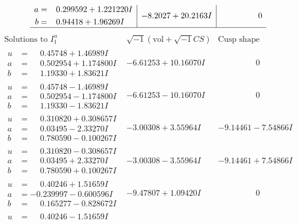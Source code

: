 \documentclass[1p]{elsarticle_modified}
\theoremstyle{definition}
\newcommand{\I}{\sqrt{-1}}
\begin{document}
$$\begin{array}{c|c|c}
\begin{aligned}
a &= \phantom{-}0.299592 + 1.221220 I \\
b &= \phantom{-}0.94418 + 1.96269 I\end{aligned}
 & -8.2027 + 20.2163 I & \phantom{-0.000000 } 0\\
 \hline 
 \end{array}$$\newpage$$\begin{array}{c|c|c}  
\text{Solutions to }I^u_{1}& \I (\text{vol} + \sqrt{-1}CS) & \text{Cusp shape}\\
 \hline 
\begin{aligned}
u &= \phantom{-}0.45748 + 1.46989 I \\
a &= \phantom{-}0.502954 + 1.174800 I \\
b &= \phantom{-}1.19330 + 1.83621 I\end{aligned}
 & -6.61253 + 10.16070 I & \phantom{-0.000000 } 0 \\ \hline\begin{aligned}
u &= \phantom{-}0.45748 - 1.46989 I \\
a &= \phantom{-}0.502954 - 1.174800 I \\
b &= \phantom{-}1.19330 - 1.83621 I\end{aligned}
 & -6.61253 - 10.16070 I & \phantom{-0.000000 } 0 \\ \hline\begin{aligned}
u &= \phantom{-}0.310820 + 0.308657 I \\
a &= \phantom{-}0.03495 - 2.33270 I \\
b &= \phantom{-}0.780590 - 0.100267 I\end{aligned}
 & -3.00308 + 3.55964 I & -9.14461 - 7.54866 I \\ \hline\begin{aligned}
u &= \phantom{-}0.310820 - 0.308657 I \\
a &= \phantom{-}0.03495 + 2.33270 I \\
b &= \phantom{-}0.780590 + 0.100267 I\end{aligned}
 & -3.00308 - 3.55964 I & -9.14461 + 7.54866 I \\ \hline\begin{aligned}
u &= \phantom{-}0.40246 + 1.51659 I \\
a &= -0.239997 - 0.600596 I \\
b &= \phantom{-}0.165277 - 0.828672 I\end{aligned}
 & -9.47807 + 1.09420 I & \phantom{-0.000000 } 0 \\ \hline\begin{aligned}
u &= \phantom{-}0.40246 - 1.51659 I \\

\end{aligned}
\end{array}$$
\end{document}
